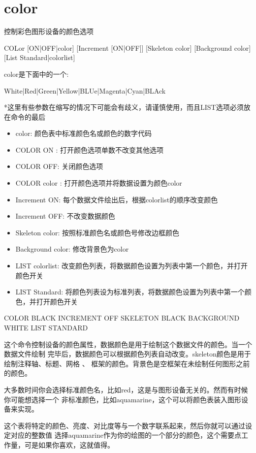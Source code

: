 \section{color}
\label{cmd:color}

控制彩色图形设备的颜色选项

COLor [ON|OFF|color] [Increment [ON|OFF]] [Skeleton color] [Background color] [List Standard|colorlist]

color是下面中的一个:

White|Red|Green|Yellow|BLUe|Magenta|Cyan|BLAck
		
*这里有些参数在缩写的情况下可能会有歧义，请谨慎使用，而且LIST选项必须放在命令的最后

\begin{itemize}
\item color: 颜色表中标准颜色名或颜色的数字代码
\item COLOR ON : 打开颜色选项单数不改变其他选项
\item COLOR OFF: 关闭颜色选项
\item COLOR color : 打开颜色选项并将数据设置为颜色color
\item Increment ON: 每个数据文件绘出后，根据colorlist的顺序改变颜色
\item Increment OFF: 不改变数据颜色 
\item Skeleton color: 按照标准颜色名或颜色号修改边框颜色
\item Background color: 修改背景色为color
\item LIST colorlist: 改变颜色列表，将数据颜色设置为列表中第一个颜色，并打开颜色开关
\item LIST Standard: 将颜色列表设为标准列表，将数据颜色设置为列表中第一个颜色，并打开颜色开关
\end{itemize}

COLOR BLACK INCREMENT OFF SKELETON BLACK BACKGROUND WHITE LIST STANDARD

这个命令控制设备的颜色属性，数据颜色是用于绘制这个数据文件的颜色。当一个数据文件绘制
完毕后，数据颜色可以根据颜色列表自动改变。skeleton颜色是用于绘制注释轴、标题、网格 、
框架的颜色。背景色是空框架在未绘制任何图形之前的颜色。

大多数时间你会选择标准颜色名，比如red，这是与图形设备无关的。然而有时候你可能想选择一个
非标准颜色，比如aquamarine，这个可以将颜色表装入图形设备来实现。

这个表将特定的颜色、亮度、对比度等与一个数字联系起来，然后你就可以通过设定对应的整数值
选择aquamarine作为你的绘图的一个部分的颜色，这个需要点工作量，可是如果你喜欢，这就值得。

